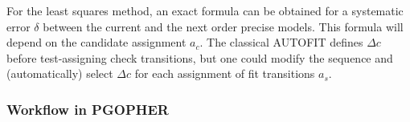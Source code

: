 \documentclass[11pt]{article}
\begin{document}
For the least squares method, an exact formula can be obtained for a systematic error $\delta$ between the current and the next order precise models. This formula will depend on the candidate assignment $a_c$. The classical AUTOFIT defines $\Delta c$ before test-assigning check transitions, but one could modify the sequence and (automatically) select $\Delta c$ for each assignment of fit transitions $a_s$.  




\subsubsection{Workflow in PGOPHER}

\end{document}
